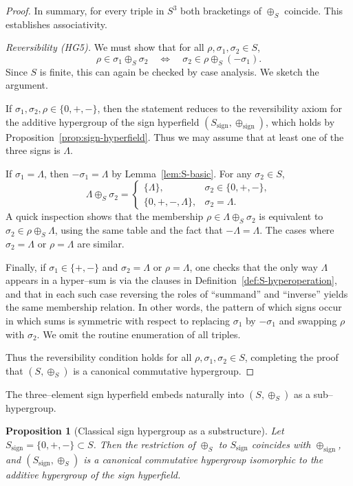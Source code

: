\documentclass[11pt]{amsart}
\numberwithin{equation}{section}
\newtheorem{proposition}[theorem]{Proposition}
\theoremstyle{definition}
\theoremstyle{remark}
\newcommand{\Sset}{S}                      %
\newcommand{\sop}{\oplus_S}                %
\begin{document}
\begin{proof}
\smallskip
\noindent
In summary, for every triple in $\Sset^3$ both bracketings of $\sop$
coincide.  This establishes associativity.

\smallskip\noindent
\emph{Reversibility (HG5).}  We must show that for all
$\rho,\sigma_1,\sigma_2\in\Sset$,
\[
  \rho\in\sigma_1\sop\sigma_2
  \quad\Longleftrightarrow\quad
  \sigma_2\in\rho\sop(-\sigma_1).
\]
Since $\Sset$ is finite, this can again be checked by case analysis.
We sketch the argument.

If $\sigma_1,\sigma_2,\rho\in\{0,+,-\}$, then the statement reduces to
the reversibility axiom for the additive hypergroup of the sign
hyperfield $(S_{\mathrm{sign}},\oplus_{\mathrm{sign}})$, which holds
by Proposition~\ref{prop:sign-hyperfield}.  Thus we may assume that at
least one of the three signs is $\Lambda$.

If $\sigma_1=\Lambda$, then $-\sigma_1=\Lambda$ by
Lemma~\ref{lem:S-basic}.  For any $\sigma_2\in\Sset$,
\[
  \Lambda\sop\sigma_2
  =
  \begin{cases}
    \{\Lambda\},        & \sigma_2\in\{0,+,-\},\\[2pt]
    \{0,+,-,\Lambda\},  & \sigma_2=\Lambda.
  \end{cases}
\]
A quick inspection shows that the membership
$\rho\in\Lambda\sop\sigma_2$ is equivalent to
$\sigma_2\in\rho\sop\Lambda$, using the same table and the fact that
$-\Lambda=\Lambda$.  The cases where $\sigma_2=\Lambda$ or
$\rho=\Lambda$ are similar.

Finally, if $\sigma_1\in\{+,-\}$ and $\sigma_2=\Lambda$ or
$\rho=\Lambda$, one checks that the only way $\Lambda$ appears in a
hyper--sum is via the clauses in Definition~\ref{def:S-hyperoperation},
and that in each such case reversing the roles of ``summand'' and
``inverse'' yields the same membership relation.  In other words, the
pattern of which signs occur in which sums is symmetric with respect
to replacing $\sigma_1$ by $-\sigma_1$ and swapping $\rho$ with
$\sigma_2$.  We omit the routine enumeration of all triples.

Thus the reversibility condition holds for all
$\rho,\sigma_1,\sigma_2\in\Sset$, completing the proof that
$(\Sset,\sop)$ is a canonical commutative hypergroup.
\end{proof}

The three--element sign hyperfield embeds naturally into
$(\Sset,\sop)$ as a sub--hypergroup.

\begin{proposition}[Classical sign hypergroup as a substructure]
\label{prop:S-sign-subhypergroup}
Let $S_{\mathrm{sign}}=\{0,+,-\}\subset\Sset$.  Then the restriction
of $\sop$ to $S_{\mathrm{sign}}$ coincides with
$\oplus_{\mathrm{sign}}$, and $(S_{\mathrm{sign}},\sop)$ is a
canonical commutative hypergroup isomorphic to the additive hypergroup
of the sign hyperfield.
\end{proposition}
\end{document}
